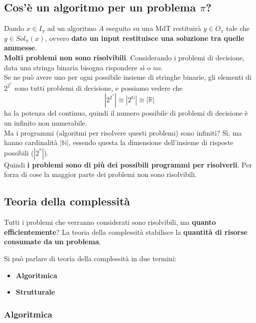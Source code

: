 \newpage

\subsection{Cos'è un algoritmo per un problema $\pi$?}

Dando $x \in I_\pi$ ad un algoritmo $A$ eseguito su una MdT restituirà $y \in O_\pi$ tale che $y \in Sol_\pi (x)$, ovvero \textbf{dato un input restituisce una soluzione tra quelle ammesse}.\\

\textbf{Molti problemi non sono risolvibili}. Considerando i problemi di decisione, data una stringa binaria bisogna rispondere $sì$ o $no$.\\

Se ne può avere uno per ogni possibile insieme di stringhe binarie, gli elementi di $2^{2^\ast}$ sono tutti problemi di decisione, e possiamo vedere che
$$ |2^{2^\ast}| \cong |2^{\mathbb{N}}| \cong |\mathbb{R}|$$
ha la potenza del continuo, quindi il numero possibile di problemi di decisione è un infinito non numerabile. \\

Ma i programmi (algoritmi per risolvere questi problemi) sono infiniti? Sì, ma hanno cardinalità $|\mathbb{N}|$, essendo questa la dimensione dell'insieme di risposte possibili ($|2^\ast|$).\\

Quindi \textbf{i problemi sono di più dei possibili programmi per risolverli}. Per forza di cose la maggior parte dei problemi non sono risolvibili. \\

\newpage

\subsection{Teoria della complessità}
Tutti i problemi che verranno considerati sono risolvibili, ma \textbf{quanto efficientemente}? La teoria della complessità stabilisce la \textbf{quantità di risorse consumate da un problema}.

Si può parlare di teoria della complessità in due termini:
\begin{itemize}
	\item \textbf{Algoritmica}
	\item \textbf{Strutturale}
\end{itemize}


\subsubsection{Algoritmica}

